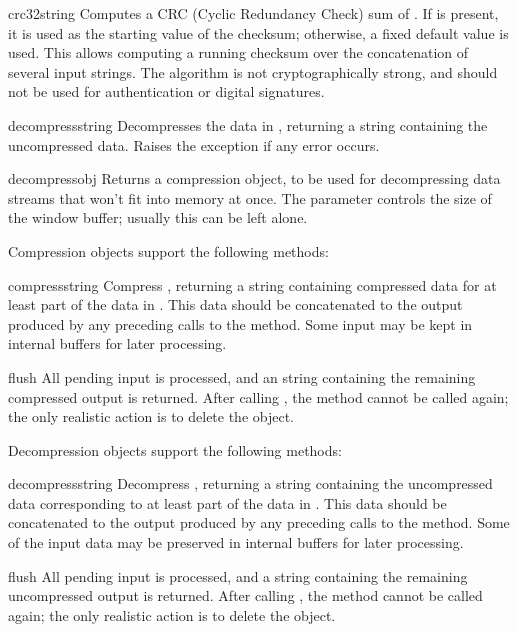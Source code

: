 \begin{funcdesc}{crc32}{string}
   Computes a CRC (Cyclic Redundancy Check) sum of . If
    is present, it is used as the starting value of the
   checksum; otherwise, a fixed default value is used.  This allows
   computing a running checksum over the concatenation of several
   input strings.  The algorithm is not cryptographically strong, and
   should not be used for authentication or digital signatures.
\end{funcdesc}

\begin{funcdesc}{decompress}{string}
Decompresses the data in , returning a string containing
the uncompressed data.  Raises the  exception if any
error occurs.
\end{funcdesc}

\begin{funcdesc}{decompressobj}{}
Returns a compression object, to be used for decompressing data streams
  that won't fit into memory at once.  The  parameter controls the size of the window buffer; usually this can be left alone.
\end{funcdesc}

Compression objects support the following methods:

\begin{funcdesc}{compress}{string}
Compress , returning a string containing compressed data
for at least part of the data in .  This data should be
concatenated to the output produced by any preceding calls to the
 method.  Some input may be kept in internal buffers
for later processing.
\end{funcdesc}

\begin{funcdesc}{flush}{}
All pending input is processed, and an string containing the remaining
compressed output is returned.  After calling , the
 method cannot be called again; the only realistic
action is to delete the object.
\end{funcdesc}

Decompression objects support the following methods:

\begin{funcdesc}{decompress}{string}
Decompress , returning a string containing the
uncompressed data corresponding to at least part of the data in
.  This data should be concatenated to the output produced
by any preceding calls to the
 method.  Some of the input data may be preserved in internal buffers
for later processing.
\end{funcdesc}

\begin{funcdesc}{flush}{}
All pending input is processed, and a string containing the remaining
uncompressed output is returned.  After calling , the
 method cannot be called again; the only realistic
action is to delete the object.
\end{funcdesc}



